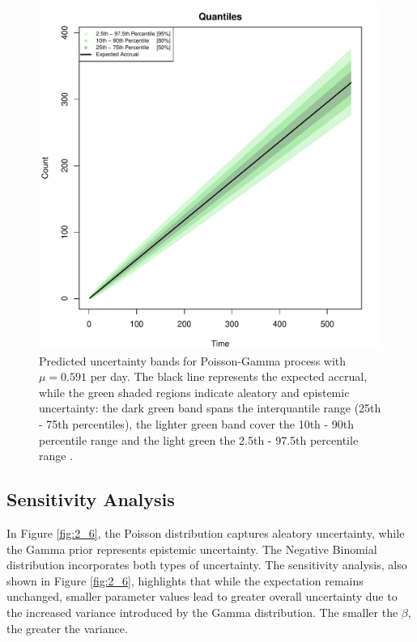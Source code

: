\begin{figure}
\begin{knitrout}
\color{fgcolor}

{\centering \includegraphics[width=\textwidth-3cm]{figure/ch02_figunnamed-chunk-9-1} 

}


\end{knitrout}
  \caption{Predicted uncertainty bands for Poisson-Gamma process with $\mu = 0.591$ per day. The black line represents the expected accrual, while the green shaded regions indicate aleatory and epistemic uncertainty: the dark green band spans the interquantile range (25th - 75th percentiles), the lighter green band cover the 10th - 90th percentile range and the light green the 2.5th - 97.5th percentile range \citep{spiegelhalter2011visualizing}.}
  \label{fig:2_8}
\end{figure}

\subsection{Sensitivity Analysis}

In Figure \ref{fig:2_6}, the Poisson distribution captures aleatory uncertainty, while the Gamma prior represents epistemic uncertainty. The Negative Binomial distribution incorporates both types of uncertainty. The sensitivity analysis, also shown in Figure \ref{fig:2_6}, highlights that while the expectation remains unchanged, smaller parameter values lead to greater overall uncertainty due to the increased variance introduced by the Gamma distribution. The smaller the $\beta$, the greater the variance.


